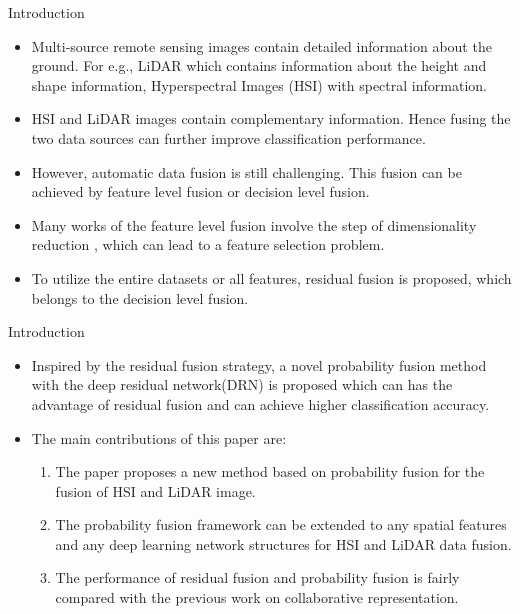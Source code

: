 \documentclass{beamer}
\begin{document}
\begin{frame}{Introduction}
\begin{itemize}
    \item Multi-source remote sensing images contain detailed information about the ground. For e.g., LiDAR which contains information about the height and shape information, Hyperspectral Images (HSI) with spectral information. 
    \item HSI and LiDAR images contain complementary information. Hence fusing the two data sources can further improve classification performance.
    \item However, automatic data fusion is still challenging. This fusion can be achieved by feature level fusion or decision level fusion.
    \item Many works of the feature level fusion involve the step of dimensionality reduction , which can lead to a feature selection problem.
    \item To utilize the entire datasets or all features, residual fusion is proposed, which belongs to the decision level fusion.
\end{itemize}
\end{frame}

\begin{frame}{Introduction}
    \begin{itemize}
        \item Inspired by the residual fusion strategy, a novel probability fusion method with the deep residual network(DRN) is proposed which can has the advantage of residual fusion and can achieve higher classification accuracy.
    \item The main contributions of this paper are:
    \begin{enumerate}
        \item The paper proposes a new method based on probability fusion for the fusion of HSI and LiDAR image.
        \item The probability fusion framework can be extended to any spatial features and any deep learning network structures for HSI and LiDAR data fusion.
        \item The performance of residual fusion and probability fusion is fairly compared with the previous work on collaborative representation.
    \end{enumerate}
    \end{itemize}
\end{frame}
\end{document}
